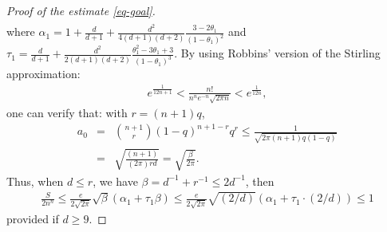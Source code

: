 \documentclass[12pt]{amsart}
\theoremstyle{definition}
\begin{document}
\begin{proof}[Proof of the estimate \eqref{eq-goal}]
\begin{eqnarray*}
\end{eqnarray*}
where $\alpha_1=1+\frac{d}{d+1}+\frac{d^2}{4(d+1)(d+2)}\frac{3-2\theta_1}{(1-\theta_1)^2}$ and $\tau_1=\frac{d}{d+1}+\frac{d^2}{2(d+1)(d+2)}\frac{\theta_1^2-3\theta_1+3}{(1-\theta_1)^3}$.
By using Robbins' version of the Stirling approximation:
\begin{eqnarray*}
    e^{\frac{1}{12n+1}}<\frac{n!}{n^n e^{-n}\sqrt{2\pi n}}< e^{\frac{1}{12 n}},
\end{eqnarray*}
one can verify that: with $r=(n+1)q$,  
\begin{eqnarray*}
    a_0&=&\binom{n+1}{r}(1-q)^{n+1-r}q^r\le 
    \frac{1}{\sqrt{2\pi (n+1)q (1-q)}}\\   
    &=&%
    \sqrt{\frac{(n+1)}{(2\pi) rd}}=\sqrt{\frac{\beta}{2\pi}}. 
\end{eqnarray*}
Thus, when $d\leq r$, we have $\beta=d^{-1}+r^{-1}\leq 2d^{-1}$, then
\begin{eqnarray*}
     \frac{S}{2n^n}
     \leq  \frac{e}{2\sqrt{2\pi}}\sqrt{\beta}
     \left(\alpha_1+\tau_1\beta\right)\leq \frac{e}{2\sqrt{2\pi}}\sqrt{(2/d)}\left(\alpha_1+\tau_1\cdot (2/d)\right)\leq 1
\end{eqnarray*}
provided if $d\geq 9$. 


\end{proof}
\end{document}

